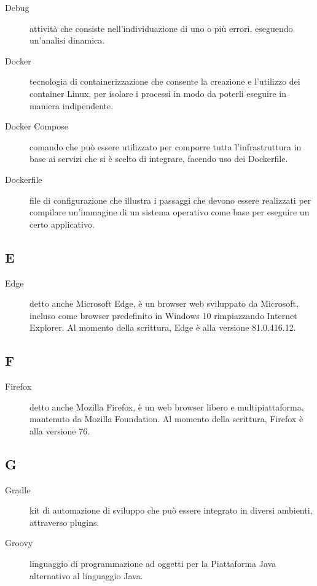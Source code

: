 \documentclass[../../../manuale.sviluppatore.tex]{subfiles}
\begin{document}
\begin{description}
    \item[Debug] attività che consiste nell'individuazione di uno o più errori, eseguendo un'analisi dinamica.
    \item[Docker] tecnologia di containerizzazione che consente la creazione e l'utilizzo dei container Linux, per isolare i processi in modo da poterli eseguire in maniera indipendente.
    \item[Docker Compose] comando che può essere utilizzato per comporre tutta l’infrastruttura in base ai servizi che si è scelto di integrare, facendo uso dei Dockerfile.
    \item[Dockerfile] file di configurazione che illustra i passaggi che devono essere realizzati per compilare un’immagine di un sistema operativo come base per eseguire un certo applicativo.
\end{description}

\subsection{E}

\begin{description}
  \item[Edge] detto anche Microsoft Edge, è un browser web sviluppato da Microsoft, incluso come browser predefinito in Windows 10 rimpiazzando Internet Explorer. Al momento della scrittura, Edge è alla versione 81.0.416.12.
\end{description}

\subsection{F}

\begin{description}
  \item[Firefox] detto anche Mozilla Firefox, è un web browser libero e multipiattaforma, mantenuto da Mozilla Foundation. Al momento della scrittura, Firefox è alla versione 76.
\end{description}

\subsection{G}

\begin{description}
    \item[Gradle] kit di automazione di sviluppo che può essere integrato in diversi ambienti, attraverso plugins.
    \item[Groovy] linguaggio di programmazione ad oggetti per la Piattaforma Java alternativo al linguaggio Java.
\end{description}
\end{document}
